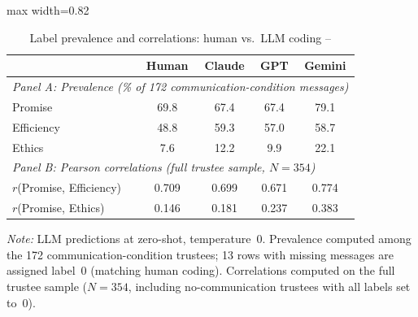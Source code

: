 \begin{table}
    \centering
    \caption{Label prevalence and correlations: human vs.\ LLM coding -- \citet{ederer_schneider_2022}}
    \label{tab:ederer_descriptives}
    \begin{adjustbox}{max width=0.82\linewidth}
    \small
    \begin{tabular}{lcccc}
        \toprule
         & Human & Claude & GPT & Gemini \\
        \midrule
        \multicolumn{5}{l}{\textit{Panel A: Prevalence (\% of 172 communication-condition messages)}} \\
        Promise    & 69.8 & 67.4 & 67.4 & 79.1 \\
        Efficiency & 48.8 & 59.3 & 57.0 & 58.7 \\
        Ethics     &  7.6 & 12.2 &  9.9 & 22.1 \\
        \midrule
        \multicolumn{5}{l}{\textit{Panel B: Pearson correlations (full trustee sample, $N=354$)}} \\
        $r$(Promise, Efficiency) & 0.709 & 0.699 & 0.671 & 0.774 \\
        $r$(Promise, Ethics)     & 0.146 & 0.181 & 0.237 & 0.383 \\
        \bottomrule
    \end{tabular}
    \end{adjustbox}
    \vspace{0.2cm}
    \begin{minipage}{0.82\linewidth}
        \footnotesize
        \textit{Note:} LLM predictions at zero-shot, temperature~0. Prevalence computed among the 172 communication-condition trustees; 13 rows with missing messages are assigned label~0 (matching human coding). Correlations computed on the full trustee sample ($N=354$, including no-communication trustees with all labels set to~0).
    \end{minipage}
\end{table}
